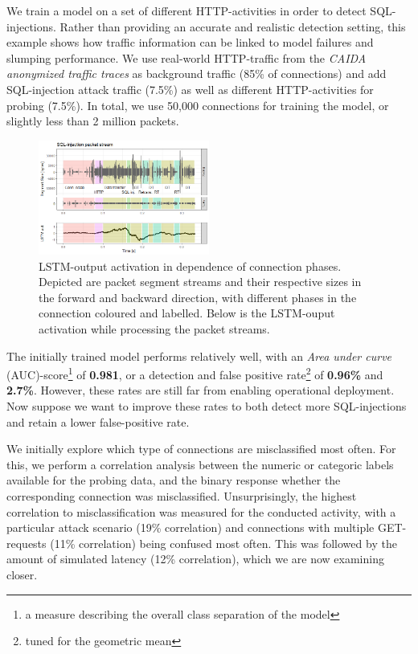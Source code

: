 \documentclass[conference]{IEEEtran}
\begin{document}
We train a model on a set of different HTTP-activities in order to detect SQL-injections. Rather than providing an accurate and realistic detection setting, this example shows how traffic information can be linked to model failures and slumping performance. We use real-world HTTP-traffic from the \textit{CAIDA anonymized traffic traces} \cite{walsworth2015caida} as background traffic (85\% of connections) and add SQL-injection attack traffic (7.5\%) as well as different HTTP-activities for probing (7.5\%). In total, we use 50,000 connections for training the model, or slightly less than 2 million packets. 


\begin{figure}
\centering
\includegraphics[width=0.5\textwidth]{images/LSTM_activation.png}
\caption{LSTM-output activation in dependence of connection phases. Depicted are packet segment streams and their respective sizes in the forward and backward direction, with different phases in the connection coloured and labelled. Below is the LSTM-ouput activation while processing the packet streams.}\label{fig:LSTM_act}
\end{figure}

The initially trained model performs relatively well, with an \textit{Area under curve} (AUC)-score\footnote{a measure describing the overall class separation of the model} of \textbf{0.981}, or a detection and false positive rate\footnote{tuned for the geometric mean} of \textbf{0.96\%} and \textbf{2.7\%}. However, these rates are still far from enabling operational deployment. Now suppose we want to improve these rates to both detect more SQL-injections and retain a lower false-positive rate.

We initially explore which type of connections are misclassified most often. For this, we perform a correlation analysis between the numeric or categoric labels available for the probing data, and the binary response whether the corresponding connection was misclassified. Unsurprisingly, the highest correlation to misclassification was measured for the conducted activity, with a particular attack scenario (19\% correlation) and connections with multiple GET-requests (11\% correlation) being confused most often. This was followed by the amount of simulated latency (12\% correlation), which we are now examining closer.
\end{document}
